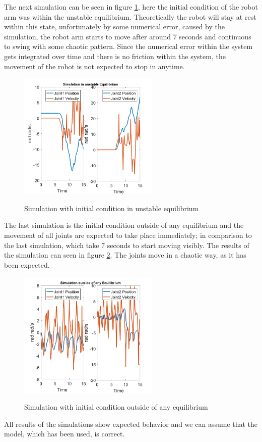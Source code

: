 The next simulation can be seen in figure \ref{fig:unstable}, here the initial condition of the robot arm was within the unstable equilibrium. Theoretically the robot will stay at rest within this state, unfortunately by some numerical error, caused by the simulation, the robot arm starts to move after around 7 seconds and continuous to swing with some chaotic pattern. Since the numerical error within the system gets integrated over time and there is no friction within the system, the movement of the robot is not expected to stop in anytime.
\begin{figure}[]
	\centering
	\includegraphics[width=0.60\textwidth]{pics/SimulationinunstableEquilibrium.png}\\
	\caption{Simulation with initial condition in unstable equilibrium}
	\label{fig:unstable}
\end{figure}

The last simulation is the initial condition outside of any equilibrium and the movement of all joints are expected to take place immediately; in comparison to the last simulation, which take 7 seconds to start moving visibly. The results of the simulation can seen in figure \ref{fig:outside}. The joints move in a chaotic way, as it has been expected.
\begin{figure}[]
	\centering
	\includegraphics[width=0.60\textwidth]{pics/Simulationoutsideofanyequilibrium.png}\\
	\caption{Simulation with initial condition outside of any equilibrium}
	\label{fig:outside}
\end{figure}

All results of the simulations show expected behavior and we can assume that the model, which has been used, is correct.
